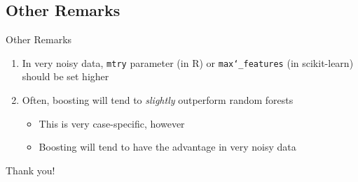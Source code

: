 \documentclass[pdf]{beamer}
\begin{document}
	\subsection{Other Remarks}
		\begin{frame}{Other Remarks}
			\begin{enumerate}
				\item In very noisy data, \texttt{mtry} parameter (in R) or \texttt{max\char`_features} (in scikit-learn) should be set higher
				\item Often, boosting will tend to \textit{slightly} outperform random forests
					\begin{itemize}
						\item This is very case-specific, however
						\item Boosting will tend to have the advantage in very noisy data
					\end{itemize}
				
			\end{enumerate}
		\end{frame}
		
	\begin{frame}{\hspace{3 mm}}
		\begin{center}
			Thank you!
		\end{center}
	\end{frame} 
		
		
		
\end{document}
